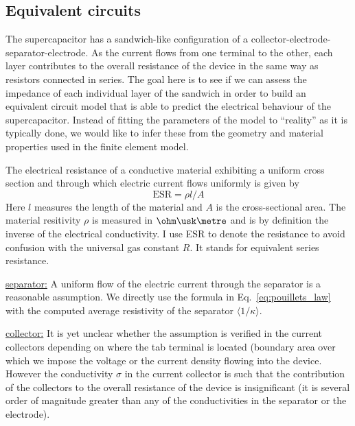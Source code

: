 \subsection{Equivalent circuits}

The supercapacitor has a sandwich-like configuration of a collector-electrode-
separator-electrode.  As the current flows from one terminal to the other,
each layer contributes to the overall resistance of the device in the same way
as resistors connected in series.  The goal here is to see if we can assess
the impedance of each individual layer of the sandwich in order to build an
equivalent circuit model that is able to predict the electrical behaviour of the
supercapacitor.  Instead of fitting the parameters of the model to ``reality''
as it is typically done, we would like to infer these from the geometry and 
material properties used in the finite element model.

The electrical resistance of a conductive material exhibiting a uniform cross
section and through which electric current flows uniformly is given by
\begin{equation}
    \text{ESR} = \rho l / A
    \label{eq:pouillets_law}
\end{equation}
Here $l$ measures the length of the material and $A$ is the cross-sectional
area.  The material resitivity $\rho$ is measured in $\ohm\usk\metre$ and is
by definition the inverse of the electrical conductivity.
I use ESR to denote the resistance to avoid confusion with the universal gas
constant $R$.  It stands for equivalent series resistance.

\underline{separator:}
A uniform flow of the electric current through the separator is a reasonable
assumption.  We directly use the formula in Eq.~\eqref{eq:pouillets_law} with 
the computed average resistivity of the separator 
$\langle 1 / \kappa \rangle$.

\underline{collector:}
It is yet unclear whether the assumption is verified in the current
collectors depending on where the tab terminal is located (boundary area over
which we impose the voltage or the current density flowing into the device.
However the conductivity $\sigma$ in the current collector is such that
the contribution of the collectors to the overall resistance of the device is
insignificant (it is several order of magnitude greater than any of the
conductivities in the separator or the electrode).

